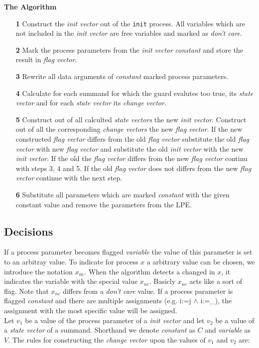 \documentclass[a4paper,9pt]{article}
\begin{document}
\textbf{The Algorithm}
\begin{enumerate}
\item[\textbf{1}] Construct the \textit{init vector} out of the \verb"init" process.
All variables which are not included in the \textit{init vector} are free variables and marked as \textit{don't care}.
\item[\textbf{2}] Mark the process parameters from the \textit{init vector} \textit{constant} and 
store the result in \textit{flag vector}.
\item[\textbf{3}] Rewrite all data arguments of \textit{constant} marked process parameters.
\item[\textbf{4}] Calculate for each summand for which the guard evalutes too true, its \textit{state vector} and 
for each \textit{state vector} its \textit{change vector}.
\item[\textbf{5}] Construct out of all calculted \textit{state vectors} the new \textit{init vector}.
Construct out of all the corresponding \textit{change vectors} the new \textit{flag vector}. 
If the new constructed \textit{flag vector} 
differs from the old \textit{flag vector} substitute the old \textit{flag vector} with new \textit{flag vector} and
 substitute the old \textit{init vector} with the new  \textit{init vector}. 
 If the old the \textit{flag vector} differs from the new \textit{flag vector} continu with steps 3, 4 and 5.
 If the old \textit{flag vector} does not differs from the new \textit{flag vector} continue with the next step.
\item[\textbf{6}] Substitute all parameters which are marked \textit{constant} with the given constant value and remove
the parameters from the LPE.
\end{enumerate}

\subsection{Decisions}

If a process parameter becomes flagged \textit{variable} the value of this parameter is set to an arbitray value.
To indicate for process $x$ a arbitrary value can be chosen, we introduce the notation $x_{nc}$.
When the algorithm detects a changed in  $x$, it indicates the variable with the special 
value $x_{nc}$. Basicly $x_{nc}$ acts like a sort of flag. Note that $x_{nc}$ differs from a \textit{don't care} value. 
If a process parameter is flagged \textit{constant} and there are multiple assignments (e.g. i:=j $\wedge$ i:=\_), 
the assignment with the most specific value will be assigned. \\
Let $v_{1}$ be a value of the process parameter of a \textit{init vector} and let $v_{2}$ be a value of a 
\textit{state vector} of a summand. 
Shorthand we denote \textit{constant} as $C$ and \textit{variable} as $V$.
The rules for constructing the \textit{change vector} upon the values of $v_{1}$ and $v_{2}$ are:
\end{document}
